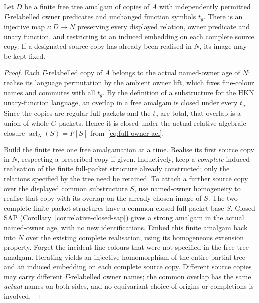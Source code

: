 \begin{lemma}
\label{lem:packet-tree-realisation}
Let $D$ be a finite free tree amalgam of copies of $A$ with
independently permitted $\Gamma$-relabelled owner predicates and
unchanged function symbols $t_g$.  There is an injective map
$\iota:D\to N$ preserving every displayed relation, owner predicate
and unary function, and restricting to an induced embedding on each
complete source copy.  If a designated source copy has already been
realised in $N$, its image may be kept fixed.
\end{lemma}
\begin{proof}
Each $\Gamma$-relabelled copy of $A$ belongs to the actual named-owner
age of $N$: realise its language permutation by the ambient owner
lift, which fixes fine-colour names and commutes with all $t_g$.
By the definition of a substructure for the HKN unary-function
language, an overlap in a free amalgam is closed under every $t_g$.
Since the copies are regular full packets and the $t_g$ are total,
that overlap is a union of whole $G$-packets.  Hence it is closed
under the actual relative algebraic closure
$\operatorname{acl}_N(S)=F[S]$ from~\eqref{eq:full-owner-acl}.

Build the finite tree one free amalgamation at a time.  Realise its
first source copy in $N$, respecting a prescribed copy if given.
Inductively, keep a \emph{complete} induced realisation of the finite
full-packet structure already constructed; only the relations
specified by the tree need be retained.  To attach a further source
copy over the displayed common substructure $S$, use named-owner
homogeneity to realise that copy with its overlap on the already
chosen image of $S$.  The two complete finite packet structures
have a common closed full-packet base $S$.  Closed SAP
(Corollary~\ref{cor:relative-closed-sap}) gives a strong amalgam in
the actual named-owner age, with no new identifications.  Embed this
finite amalgam back into $N$ over the existing complete realisation,
using its homogeneous extension property.  Forget the incident
fine colours that were not specified in the free tree amalgam.
Iterating yields an injective homomorphism of the entire partial tree
and an induced embedding on each complete source copy.  Different
source copies may carry different $\Gamma$-relabelled owner names;
the common overlap has the same \emph{actual} names on both sides,
and no equivariant choice of origins or completions is involved.
\end{proof}

